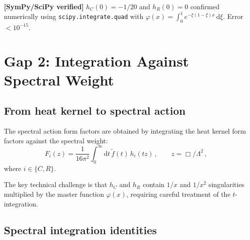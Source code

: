 \documentclass[11pt,a4paper]{article}
\renewcommand{\dd}{\mathrm{d}}
\theoremstyle{definition}
\theoremstyle{remark}
\newcommand{\verified}[1]{%
  \par\noindent\colorbox{green!10}{%
    \parbox{\dimexpr\linewidth-2\fboxsep}{%
      \textcolor{green!50!black}{\textbf{[SymPy/SciPy verified]}}
      \textcolor{green!50!black}{#1}%
    }%
  }\par%
}
\begin{document}
\verified{%
$h_C(0) = -1/20$ and $h_R(0) = 0$ confirmed numerically using
\texttt{scipy.integrate.quad} with $\varphi(x) = \int_0^1 e^{-\xi(1-\xi)x}\,\dd\xi$.
Error $< 10^{-15}$.}


\newpage
\section{Gap 2: Integration Against Spectral Weight}
\label{sec:gap2}

\subsection{From heat kernel to spectral action}

The spectral action form factors are obtained by integrating the
heat kernel form factors against the spectral weight:
\begin{equation}
  F_i(z) = \frac{1}{16\pi^2}
  \int_0^\infty \dd t\,\tilde{f}(t)\,h_i(tz)\,,
  \qquad z = \Box/\Lambda^2\,,
  \label{eq:Fi-integral}
\end{equation}
where $i \in \{C, R\}$.

The key technical challenge is that $h_C$ and $h_R$ contain
$1/x$ and $1/x^2$ singularities multiplied by the master function
$\varphi(x)$, requiring careful treatment of the $t$-integration.


\subsection{Spectral integration identities}
\end{document}
